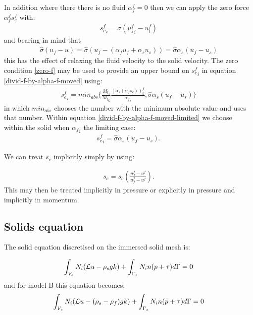In addition where there there is no fluid $\alpha^f_f=0$ then 
we can apply the zero force $\alpha^f_f s_c^f$ with:
\begin{eqnarray}
{s_c^f}_i= \hat\sigma ({u^f_f}_i-u^f_i)
\label{zero-f}
\end{eqnarray}
and bearing in mind that 
\begin{eqnarray}
\hat\sigma (u_f-u)
= \hat\sigma (u_f - (\alpha_f u_f +\alpha_s u_s) ) 
= \hat\sigma \alpha_s(u_f-u_s) 
\end{eqnarray}
this has the effect of relaxing 
the fluid velocity to the solid velocity. 
The zero condition \ref{zero-f} 
may be used to provide an upper bound 
on ${s_c^f}_i$ in equation \ref{divid-f-by-alpha-f-moved} using: 
\begin{eqnarray}
{s_c^f}_i= min_{abs}\{ \frac{{M_l}_i}{{M_l}_k} \frac{(\alpha_s(\alpha_f s_c))^f_k}{{\alpha_f}_i},  \hat\sigma \alpha_s(u_f-u_s)  \} 
\label{divid-f-by-alpha-f-moved-limited}
\end{eqnarray}
in which $min_{abs}$ chooses the number with the 
minimum absolute value and uses that number. 
Within equation \ref{divid-f-by-alpha-f-moved-limited} we choose 
within the solid when ${\alpha_f}_i$ the limiting case: 
\begin{eqnarray}
{s_c^f}_i=  \hat\sigma \alpha_s(u_f-u_s). 
\label{s-c-simple}
\end{eqnarray}


We can treat $s_c$ implicitly simply by using:

\begin{eqnarray}
s_c= s_c \left( \frac{u^f_f - u^f}{u^f_f - u^f}\right). 
\label{imp-s-c}
\end{eqnarray} 
This may then be treated implicitly in pressure or 
explicitly in pressure and implicitly in momentum. 



\subsection{Solids equation} 
The solid equation discretised 
on the immersed solid mesh is:


\begin{eqnarray}
\int_{V_s} N_i ({\cal L} u - \rho_s g k)
+\int_{\Gamma_s} N_i n (p+\tau)d\Gamma=0
\label{solids-forced}
\end{eqnarray}
and for model B this equation becomes:
\begin{eqnarray}
\int_{V_s} N_i ({\cal L} u - (\rho_s-\rho_f) g k)
+\int_{\Gamma_s} N_i n (p+\tau)d\Gamma=0
\label{solids-forced-modelB}
\end{eqnarray}

